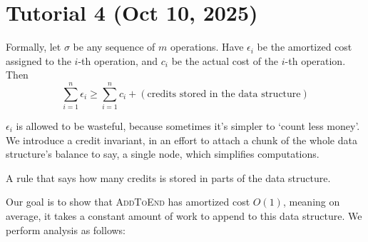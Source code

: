 \section{Tutorial 4 (Oct 10, 2025)}

Formally, let $\sigma$ be any sequence of $m$ operations. Have $\epsilon_i$ be the amortized cost assigned to the $i$-th operation, and $c_i$ be the actual cost of the $i$-th operation. Then
\[
\sum_{i=1}^{n} \epsilon_i \geq \sum_{i=1}^{n} c_i + (\text{credits stored in the data structure})
\]

$\epsilon_i$ is allowed to be wasteful, because sometimes it's simpler to `count less money'. We introduce a credit invariant, in an effort to attach a chunk of the whole data structure's balance to say, a single node, which simplifies computations.

\begin{definition}
A rule that says how many credits is stored in parts of the data structure.
\end{definition}

\begin{problem}

\end{problem}

Our goal is to show that \textsc{AddToEnd} has amortized cost $O(1)$, meaning on average, it takes a constant amount of work to append to this data structure. We perform analysis as follows:

